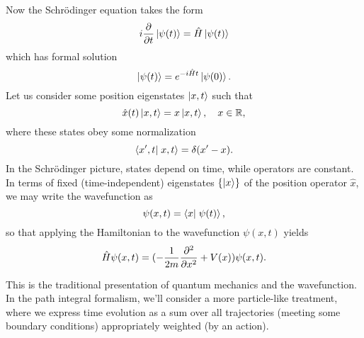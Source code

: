 Now the Schr\"odinger equation takes the form
\begin{equation}
    i\frac{\partial }{\partial t}\left| \psi(t) \right>=\hat H \left| \psi(t) \right>
\end{equation}
which has formal solution
\begin{equation}\label{schrodingerformal}
    \left| \psi(t) \right>=e^{-i\hat H t}\left| \psi(0) \right>.
\end{equation}
Let us consider some position eigenstates $\left| x,t \right>$ such that
\begin{equation*}
    \hat x(t)\left| x,t \right>=x \left| x,t \right>,\quad x\in \mathbb{R},
\end{equation*}
where these states obey some normalization
\begin{equation*}
    \braket{x',t}{x,t}=\delta(x'-x).
\end{equation*}
In the Schr\"odinger picture, states depend on time, while operators are constant. In terms of fixed (time-independent) eigenstates $\{\left| x \right>\}$ of the position operator $\hat x$, we may write the wavefunction as
\begin{equation}
    \psi(x,t)=\braket{x}{\psi(t)},
\end{equation}
so that applying the Hamiltonian to the wavefunction $\psi(x,t)$ yields
\begin{equation}
    \hat H \psi(x,t)=(-\frac{1}{2m}\frac{\partial^2}{\partial x^2} + V(x))\psi(x,t).
\end{equation}

This is the traditional presentation of quantum mechanics and the wavefunction. In the path integral formalism, we'll consider a more particle-like treatment, where we express time evolution as a sum over all trajectories (meeting some boundary conditions) appropriately weighted (by an action).

